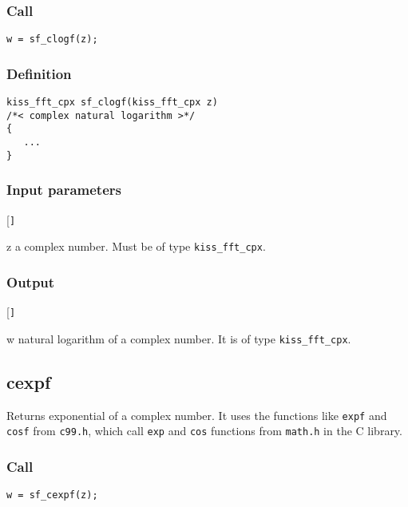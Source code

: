 \subsubsection*{Call}
\begin{verbatim}w = sf_clogf(z);\end{verbatim}

\subsubsection*{Definition}
\begin{verbatim}
kiss_fft_cpx sf_clogf(kiss_fft_cpx z)
/*< complex natural logarithm >*/
{
   ...    
}
\end{verbatim}

\subsubsection*{Input parameters}
\begin{desclist}{\tt }{\quad}[\tt ]
   \setlength\itemsep{0pt}
   \item[z] a complex number. Must be of type \texttt{kiss\_fft\_cpx}.
\end{desclist}

\subsubsection*{Output}
\begin{desclist}{\tt }{\quad}[\tt ]
   \setlength\itemsep{0pt}
   \item[w] natural logarithm of a complex number. It is of type \texttt{kiss\_fft\_cpx}.
\end{desclist}




\subsection{{cexpf}}
Returns exponential of a complex number. It uses the functions like \texttt{expf} and \texttt{cosf} from \texttt{c99.h}, which call \texttt{exp} and \texttt{cos} functions from \texttt{math.h} in the C library.

\subsubsection*{Call}
\begin{verbatim}w = sf_cexpf(z);\end{verbatim}

